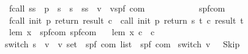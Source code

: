\begin{isabellebody}
\isanewline
{}\isamarkupfalse%
\isanewline
\ \ fcall{\isacharcolon}{\isacharcolon}\ {\isachardoublequoteopen}{\isacharparenleft}{\isacharprime}s{\isasymRightarrow}{\isacharprime}s{\isacharparenright}\ {\isasymRightarrow}\ {\isacharprime}p\ {\isasymRightarrow}\ {\isacharparenleft}{\isacharprime}s\ {\isasymRightarrow}\ {\isacharprime}s\ {\isasymRightarrow}\ {\isacharprime}s{\isacharparenright}{\isasymRightarrow}{\isacharparenleft}{\isacharprime}s\ {\isasymRightarrow}\ {\isacharprime}v{\isacharparenright}\ {\isasymRightarrow}\ {\isacharparenleft}{\isacharprime}v{\isasymRightarrow}{\isacharparenleft}{\isacharprime}s{\isacharcomma}{\isacharprime}p{\isacharcomma}{\isacharprime}f{\isacharparenright}\ com{\isacharparenright}\isanewline
\ \ \ \ \ \ \ \ \ \ \ \ {\isasymRightarrow}{\isacharparenleft}{\isacharprime}s{\isacharcomma}{\isacharprime}p{\isacharcomma}{\isacharprime}f{\isacharparenright}com{\isachardoublequoteclose}\ \isanewline
\ \ {\isachardoublequoteopen}fcall\ init\ p\ return\ result\ c\ {\isacharequal}\ call\ init\ p\ return\ {\isacharparenleft}{\isasymlambda}s\ t{\isachardot}\ c\ {\isacharparenleft}result\ t{\isacharparenright}{\isacharparenright}{\isachardoublequoteclose}\isanewline
\isanewline
{}\isamarkupfalse%
\isanewline
\ \ lem{\isacharcolon}{\isacharcolon}\ {\isachardoublequoteopen}{\isacharprime}x\ {\isasymRightarrow}\ {\isacharparenleft}{\isacharprime}s{\isacharcomma}{\isacharprime}p{\isacharcomma}{\isacharprime}f{\isacharparenright}com\ {\isasymRightarrow}{\isacharparenleft}{\isacharprime}s{\isacharcomma}{\isacharprime}p{\isacharcomma}{\isacharprime}f{\isacharparenright}com{\isachardoublequoteclose}\ \isanewline
\ \ {\isachardoublequoteopen}lem\ x\ c\ {\isacharequal}\ c{\isachardoublequoteclose}\isanewline
\isanewline
{}\isamarkupfalse%
\ switch{\isacharcolon}{\isacharcolon}\ {\isachardoublequoteopen}{\isacharparenleft}{\isacharprime}s\ {\isasymRightarrow}\ {\isacharprime}v{\isacharparenright}\ {\isasymRightarrow}\ {\isacharparenleft}{\isacharprime}v\ set\ {\isasymtimes}\ {\isacharparenleft}{\isacharprime}s{\isacharcomma}{\isacharprime}p{\isacharcomma}{\isacharprime}f{\isacharparenright}\ com{\isacharparenright}\ list\ {\isasymRightarrow}\ {\isacharparenleft}{\isacharprime}s{\isacharcomma}{\isacharprime}p{\isacharcomma}{\isacharprime}f{\isacharparenright}\ com{\isachardoublequoteclose}\ \isanewline
{}\isanewline
{\isachardoublequoteopen}switch\ v\ {\isacharbrackleft}{\isacharbrackright}\ {\isacharequal}\ Skip{\isachardoublequoteclose}\ {\isacharbar}\isanewline

\end{isabellebody}
